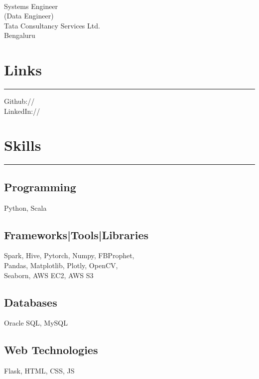 \documentclass[]{puneet-resume}
\begin{document}
%
%

\begin{minipage}[t]{0.33\textwidth} 
\begin{large}
	\\
\end{large}
Systems Engineer\\
(Data Engineer)\\
Tata Consultancy Services Ltd.\\
Bengaluru
\section{Links} 
\noindent\rule{5cm}{0.4pt}

Github:// \href{https://github.com/puneet29}{} \\
LinkedIn://  \href{https://www.linkedin.com/in/geekpuneet}{} \\
\section{Skills}
\noindent\rule{5cm}{0.4pt}
\subsection{Programming}
Python, Scala
\vspace{6pt}
\subsection{Frameworks|Tools|Libraries}
Spark, Hive, Pytorch, Numpy, FBProphet,\\
Pandas, Matplotlib, Plotly, OpenCV,\\
Seaborn, AWS EC2, AWS S3
\vspace{6pt}
\subsection{Databases}
Oracle SQL, MySQL
\vspace{6pt}
\subsection{Web Technologies}
Flask, HTML, CSS, JS
\vspace{6pt}

\end{minipage}
\end{document}
